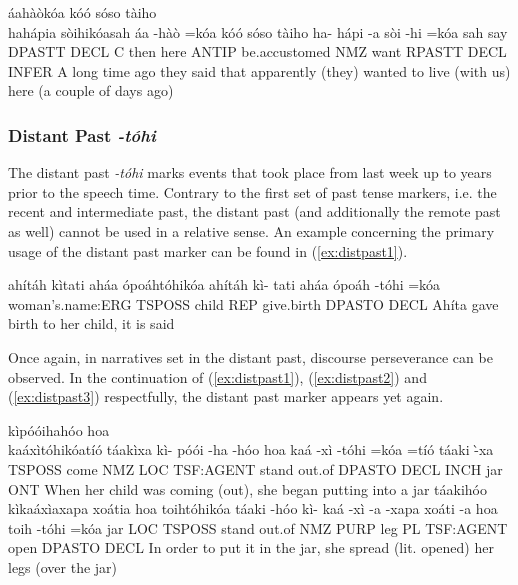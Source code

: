 \documentclass[a4paper, 12pt, oneside]{memoir}
\newcommand{\emh}[1]{\textit{#1}}
\begin{document}
\begin{examples}
    \ex \label{ex:intpast4}
    \newbaarucmd{\cl}{\baarujuncture{\texttt{==}}}
    \words áahàòkóa kóó sóso tàiho \\ hahápia sòihikóasah
    \bits áa -hàò =kóa kóó sóso tàiho ha- hápi -a sòi -hi =kóa \cl sah 
    \gloss say DPASTT DECL C then here ANTIP be.accustomed NMZ want RPASTT DECL INFER
    \tr A long time ago they said that apparently (they) wanted to live (with us) here (a couple of days ago)
\end{examples} 
\subsubsection{Distant Past \emh{-tóhi}}\label{s:distpast}
The distant past \emh{-tóhi} marks events that took place from last week up to years prior to the speech time. Contrary to the first set of past tense markers, i.e. the recent and intermediate past, the distant past (and additionally the remote past as well) cannot be used in a relative sense. An example concerning the primary usage of the distant past marker can be found in (\ref{ex:distpast1}).
\begin{examples}
    \ex \label{ex:distpast1}
    \words ahítáh kìtati aháa ópoáhtóhikóa 
    \bits ahítáh kì- tati aháa ópoáh -tóhi =kóa 
    \gloss woman's.name:ERG TSPOSS child REP give.birth DPASTO DECL 
    \tr Ahíta gave birth to her child, it is said
\end{examples}
Once again, in narratives set in the distant past, discourse perseverance can be observed. In the continuation of (\ref{ex:distpast1}), (\ref{ex:distpast2}) and (\ref{ex:distpast3}) respectfully, the distant past marker appears yet again. 
\begin{examples}
    \ex \label{ex:distpast2}
    \words kìpóóihahóo hoa \\ kaáxìtóhikóatíó táakìxa
    \bits kì- póói -ha -hóo hoa kaá -xì -tóhi =kóa =tíó táaki -̀xa
    \gloss TSPOSS come NMZ LOC TSF:AGENT stand out.of DPASTO DECL INCH jar ONT
    \tr When her child was coming (out), she began putting into a jar
    \ex \label{ex:distpast3}
    \words táakihóo kìkaáxìaxapa xoátia hoa toihtóhikóa
    \bits táaki -hóo kì- kaá -xì -a -xapa xoáti -a hoa toih -tóhi =kóa  
    \gloss jar LOC TSPOSS stand out.of NMZ PURP leg PL TSF:AGENT open DPASTO DECL
    \tr In order to put it in the jar, she spread (lit. opened) her legs (over the jar)
\end{examples}
\end{document}
